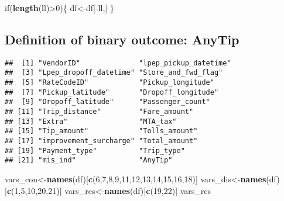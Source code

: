 \documentclass[]{article}
\newenvironment{Shaded}{\begin{snugshade}}{\end{snugshade}}
\newcommand{\KeywordTok}[1]{\textcolor[rgb]{0.13,0.29,0.53}{\textbf{{#1}}}}
\newcommand{\DataTypeTok}[1]{\textcolor[rgb]{0.13,0.29,0.53}{{#1}}}
\newcommand{\DecValTok}[1]{\textcolor[rgb]{0.00,0.00,0.81}{{#1}}}
\newcommand{\FloatTok}[1]{\textcolor[rgb]{0.00,0.00,0.81}{{#1}}}
\newcommand{\StringTok}[1]{\textcolor[rgb]{0.31,0.60,0.02}{{#1}}}
\newcommand{\CommentTok}[1]{\textcolor[rgb]{0.56,0.35,0.01}{\textit{{#1}}}}
\newcommand{\NormalTok}[1]{{#1}}
\begin{document}
\begin{Shaded}
\begin{Highlighting}[]
\NormalTok{if(}\KeywordTok{length}\NormalTok{(ll)>}\DecValTok{0}\NormalTok{)\{}
  \NormalTok{df<-df[-ll,]}
\NormalTok{\}}
\end{Highlighting}
\end{Shaded}

\subsection{Definition of binary outcome:
AnyTip}\label{definition-of-binary-outcome-anytip}

\begin{Shaded}
\end{Shaded}

\begin{verbatim}
##  [1] "VendorID"              "lpep_pickup_datetime" 
##  [3] "Lpep_dropoff_datetime" "Store_and_fwd_flag"   
##  [5] "RateCodeID"            "Pickup_longitude"     
##  [7] "Pickup_latitude"       "Dropoff_longitude"    
##  [9] "Dropoff_latitude"      "Passenger_count"      
## [11] "Trip_distance"         "Fare_amount"          
## [13] "Extra"                 "MTA_tax"              
## [15] "Tip_amount"            "Tolls_amount"         
## [17] "improvement_surcharge" "Total_amount"         
## [19] "Payment_type"          "Trip_type"            
## [21] "mis_ind"               "AnyTip"
\end{verbatim}

\begin{Shaded}
\begin{Highlighting}[]
\NormalTok{vars_con<-}\KeywordTok{names}\NormalTok{(df)[}\KeywordTok{c}\NormalTok{(}\DecValTok{6}\NormalTok{,}\DecValTok{7}\NormalTok{,}\DecValTok{8}\NormalTok{,}\DecValTok{9}\NormalTok{,}\DecValTok{11}\NormalTok{,}\DecValTok{12}\NormalTok{,}\DecValTok{13}\NormalTok{,}\DecValTok{14}\NormalTok{,}\DecValTok{15}\NormalTok{,}\DecValTok{16}\NormalTok{,}\DecValTok{18}\NormalTok{)] }
\NormalTok{vars_dis<-}\KeywordTok{names}\NormalTok{(df)[}\KeywordTok{c}\NormalTok{(}\DecValTok{1}\NormalTok{,}\DecValTok{5}\NormalTok{,}\DecValTok{10}\NormalTok{,}\DecValTok{20}\NormalTok{,}\DecValTok{21}\NormalTok{)]}
\NormalTok{vars_res<-}\KeywordTok{names}\NormalTok{(df)[}\KeywordTok{c}\NormalTok{(}\DecValTok{19}\NormalTok{,}\DecValTok{22}\NormalTok{)]}
\NormalTok{vars_res}
\end{Highlighting}
\end{Shaded}
\end{document}
